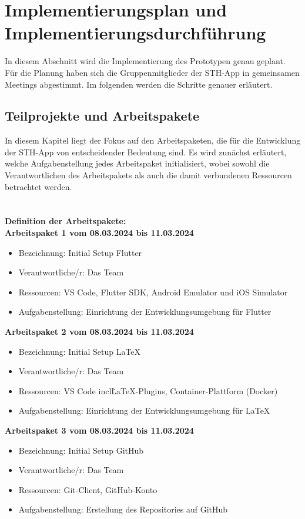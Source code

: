 
\chapter{Implementierungsplan und Implementierungsdurchführung}
In diesem Abschnitt wird die Implementierung des Prototypen genau geplant. Für die Planung haben sich die Gruppenmitglieder der STH-App in gemeinsamen Meetings abgestimmt. Im folgenden werden die Schritte genauer erläutert.

\section{Teilprojekte und Arbeitspakete}
In diesem Kapitel liegt der Fokus auf den Arbeitspaketen, die für die Entwicklung der STH-App von entscheidender Bedeutung sind. Es wird zunächst erläutert, welche Aufgabenstellung jedes Arbeitspaket initialisiert, wobei sowohl die Verantwortlichen des Arbeitspakets als auch die damit verbundenen Ressourcen betrachtet werden.
\\
\\
\\
\textbf{Definition der Arbeitspakete:} \\

\textbf{Arbeitspaket 1 vom 08.03.2024 bis 11.03.2024}
\begin{itemize}[itemsep=0pt]
    \item{Bezeichnung: Initial Setup Flutter} 
    \item{Verantwortliche/r: Das Team} 
    \item{Ressourcen: VS Code, Flutter SDK, Android Emulator und iOS Simulator} 
    \item{Aufgabenstellung: Einrichtung der Entwicklungsumgebung für Flutter}
\end{itemize} 

\textbf{Arbeitspaket 2 vom 08.03.2024 bis 11.03.2024}
\begin{itemize}[itemsep=0pt]
    \item{Bezeichnung: Initial Setup LaTeX} 
	\item{Verantwortliche/r: Das Team} 
	\item{Ressourcen: VS Code incl\. LaTeX-Plugins, Container-Plattform (Docker)} 
	\item{Aufgabenstellung: Einrichtung der Entwicklungsumgebung für LaTeX}
\end{itemize}

\textbf{Arbeitspaket 3 vom 08.03.2024 bis 11.03.2024}
\begin{itemize}[itemsep=0pt]
    \item{Bezeichnung: Initial Setup GitHub} 
	\item{Verantwortliche/r: Das Team} 
	\item{Ressourcen: Git-Client, GitHub-Konto} 
	\item{Aufgabenstellung: Erstellung des Repositories auf GitHub}
\end{itemize}


